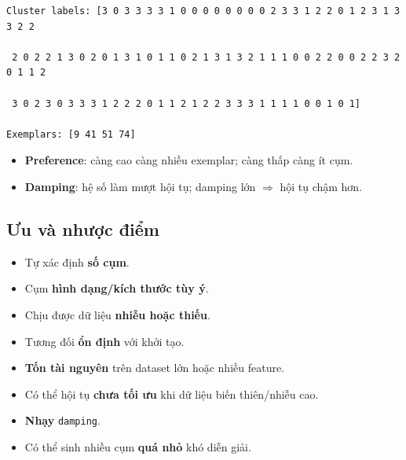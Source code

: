 \begin{vidu}[title={Output mẫu trên terminal}]
\begin{verbatim}
Cluster labels: [3 0 3 3 3 3 1 0 0 0 0 0 0 0 0 2 3 3 1 2 2 0 1 2 3 1 3 3 2 2

 2 0 2 2 1 3 0 2 0 1 3 1 0 1 1 0 2 1 3 1 3 2 1 1 1 0 0 2 2 0 0 2 2 3 2 0 1 1 2

 3 0 2 3 0 3 3 3 1 2 2 2 0 1 1 2 1 2 2 3 3 3 1 1 1 1 0 0 1 0 1]

Exemplars: [9 41 51 74]
\end{verbatim}
\end{vidu}

\begin{ynghia}[title={Preference và Damping}]
  \begin{itemize}
    \item \textbf{Preference}: càng cao càng nhiều exemplar; càng thấp càng ít cụm.
    \item \textbf{Damping}: hệ số làm mượt hội tụ; damping lớn $\Rightarrow$ hội tụ chậm hơn.
  \end{itemize}
\end{ynghia}


\subsection{Ưu và nhược điểm}

\begin{tinhchat}[title={Ưu điểm}]
\begin{itemize}
  \item Tự xác định \textbf{số cụm}.
  \item Cụm \textbf{hình dạng/kích thước tùy ý}.
  \item Chịu được dữ liệu \textbf{nhiễu hoặc thiếu}.
  \item Tương đối \textbf{ổn định} với khởi tạo.
\end{itemize}
\end{tinhchat}

\begin{luuy}[title={Nhược điểm}]
\begin{itemize}
  \item \textbf{Tốn tài nguyên} trên dataset lớn hoặc nhiều feature.
  \item Có thể hội tụ \textbf{chưa tối ưu} khi dữ liệu biến thiên/nhiễu cao.
  \item \textbf{Nhạy} \texttt{damping}.
  \item Có thể sinh nhiều cụm \textbf{quá nhỏ} khó diễn giải.
\end{itemize}
\end{luuy}
